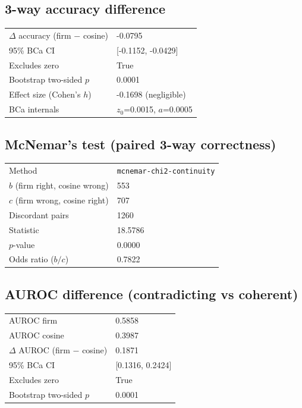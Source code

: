 \documentclass[11pt]{article}
\begin{document}
\subsection{3-way accuracy difference}
\begin{longtable}{l l}
\toprule
$\Delta$ accuracy (firm $-$ cosine) & -0.0795 \\
95\% BCa CI & [-0.1152, -0.0429] \\
Excludes zero & True \\
Bootstrap two-sided $p$ & 0.0001 \\
Effect size (Cohen's $h$) & -0.1698 (negligible) \\
BCa internals & $z_0$=0.0015, $a$=0.0005 \\
\bottomrule
\end{longtable}

\subsection{McNemar's test (paired 3-way correctness)}
\begin{longtable}{l l}
\toprule
Method & \texttt{mcnemar-chi2-continuity} \\
$b$ (firm right, cosine wrong) & 553 \\
$c$ (firm wrong, cosine right) & 707 \\
Discordant pairs & 1260 \\
Statistic & 18.5786 \\
$p$-value & 0.0000 \\
Odds ratio ($b/c$) & 0.7822 \\
\bottomrule
\end{longtable}

\subsection{AUROC difference (contradicting vs coherent)}
\begin{longtable}{l l}
\toprule
AUROC firm & 0.5858 \\
AUROC cosine & 0.3987 \\
$\Delta$ AUROC (firm $-$ cosine) & 0.1871 \\
95\% BCa CI & [0.1316, 0.2424] \\
Excludes zero & True \\
Bootstrap two-sided $p$ & 0.0001 \\
\bottomrule
\end{longtable}
\end{document}
